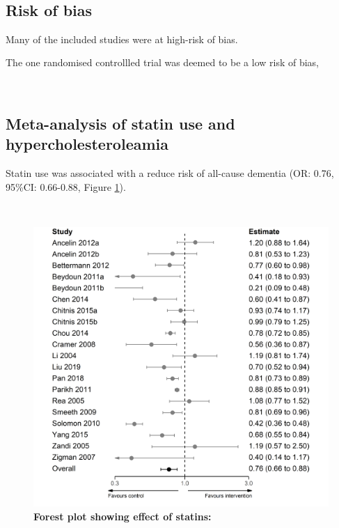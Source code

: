 \documentclass[a4paper, twoside]{templates/ociamthesis}
\begin{document}
~

\hypertarget{risk-of-bias-subheading}{%
\subsection{Risk of bias}\label{risk-of-bias-subheading}}

Many of the included studies were at high-risk of bias.

The one randomised controllled trial was deemed to be a low risk of bias,

~

\hypertarget{meta-analysis-of-statin-use-and-hypercholesteroleamia}{%
\subsection{Meta-analysis of statin use and hypercholesteroleamia}\label{meta-analysis-of-statin-use-and-hypercholesteroleamia}}

Statin use was associated with a reduce risk of all-cause dementia (OR: 0.76, 95\%CI: 0.66-0.88, Figure \ref{fig:fpStatins}).

~





\begin{figure}[H]
\includegraphics[width=1\linewidth]{figures/sys-rev/forester_statins_any} \caption[Forest plot showing effect of statins]{\textbf{Forest plot showing effect of statins:}}\label{fig:fpStatins}
\end{figure}
\end{document}
